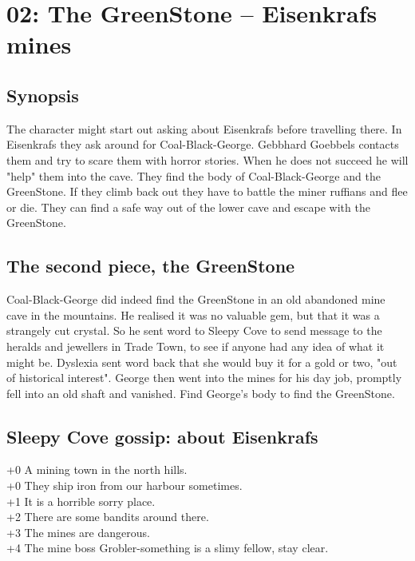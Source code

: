 \clearpage
{}
\section*{02: The GreenStone -- Eisenkrafs mines}
\label{sec:02GreenStone}


\subsection*{Synopsis}
The character might start out asking about Eisenkrafs before travelling there. In Eisenkrafs they ask around for Coal-Black-George. Gebbhard Goebbels contacts them and try to scare them with horror stories. When he does not succeed he will "help" them into the cave. They find the body of Coal-Black-George and the GreenStone. If they climb back out they have to battle the miner ruffians and flee or die. They can find a safe way out of the lower cave and escape with the GreenStone.


\subsection*{The second piece, the GreenStone}
Coal-Black-George did indeed find the GreenStone in an old abandoned mine cave in the mountains. He realised it was no valuable gem, but that it was a strangely cut crystal. So he sent word to Sleepy Cove to send message to the heralds and jewellers in Trade Town, to see if anyone had any idea of what it might be. Dyslexia sent word back that she would buy it for a gold or two, "out of historical interest". George then went into the mines for his day job, promptly fell into an old shaft and vanished. Find George's body to find the GreenStone.


\subsection*{Sleepy Cove gossip: about Eisenkrafs}
+0 A mining town in the north hills. \\
+0 They ship iron from our harbour sometimes. \\
+1 It is a horrible sorry place. \\
+2 There are some bandits around there. \\
+3 The mines are dangerous. \\
+4 The mine boss Grobler-something is a slimy fellow, stay clear. \\



